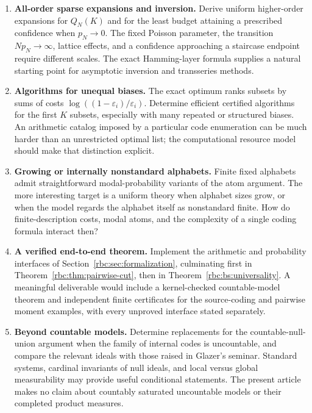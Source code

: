 \documentclass[11pt]{article}
\numberwithin{equation}{section}
\theoremstyle{definition}
\theoremstyle{remark}
\begin{document}
\begin{enumerate}[label=\textbf{Q\arabic*.},ref=Q\arabic*,leftmargin=*]
\item \textbf{All-order sparse expansions and inversion.}\label{rbc:q:sparse}
Derive uniform higher-order expansions for $Q_N(K)$ and for the least
budget attaining a prescribed confidence when $p_N\to0$. The fixed
Poisson parameter, the transition $Np_N\to\infty$, lattice effects,
and a confidence approaching a staircase endpoint require different
scales. The exact Hamming-layer formula supplies a natural starting
point for asymptotic inversion and transseries methods.

\item \textbf{Algorithms for unequal biases.}\label{rbc:q:unequal}
The exact optimum ranks subsets by sums of costs
$\log((1-\varepsilon_i)/\varepsilon_i)$. Determine efficient certified
algorithms for the first $K$ subsets, especially with many repeated or
structured biases. An arithmetic catalog imposed by a particular code
enumeration can be much harder than an unrestricted optimal list; the
computational resource model should make that distinction explicit.

\item \textbf{Growing or internally nonstandard alphabets.}\label{rbc:q:alphabets}
Finite fixed alphabets admit straightforward modal-probability variants
of the atom argument. The more interesting target is a uniform theory
when alphabet sizes grow, or when the model regards the alphabet itself
as nonstandard finite. How do finite-description costs, modal atoms,
and the complexity of a single coding formula interact then?

\item \textbf{A verified end-to-end theorem.}\label{rbc:q:verified}
Implement the arithmetic and probability interfaces of
Section~\ref{rbc:sec:formalization}, culminating first in
Theorem~\ref{rbc:thm:pairwise-cut}, then in
Theorem~\ref{rbc:bs:universality}. A meaningful deliverable would include a
kernel-checked countable-model theorem and independent finite certificates
for the source-coding and pairwise moment examples, with every unproved
interface stated separately.

\item \textbf{Beyond countable models.}\label{rbc:q:uncountable}
Determine replacements for the countable-null-union argument when the
family of internal codes is uncountable, and compare the relevant ideals
with those raised in Glazer's seminar. Standard systems, cardinal
invariants of null ideals, and local versus global measurability may
provide useful conditional statements. The present article makes no
claim about countably saturated uncountable models or their completed
product measures.
\end{enumerate}
\end{document}
